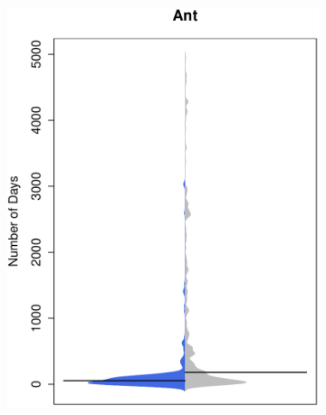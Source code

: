 \begin{figure}[t]
	\centering
	
	
	\begin{subfigure}[b]{0.20\textwidth}
		\includegraphics[width=\textwidth]{figures/test/ant_update.pdf}
		\label{fig:removal_comparison_gerrit}
	\end{subfigure}
  ~
  ~
  ~
	\begin{subfigure}[b]{0.20\textwidth}

\end{subfigure}
\end{figure}
